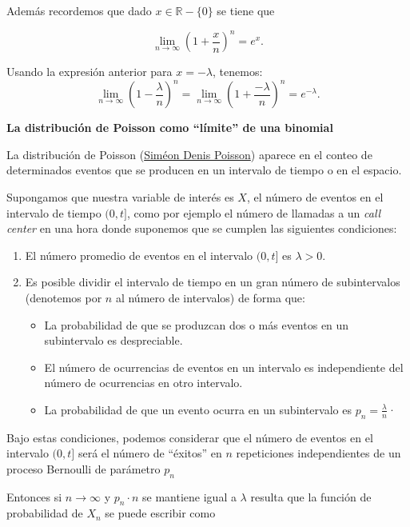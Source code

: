 \documentclass[]{book}
\providecommand{\tightlist}{%
  \setlength{\itemsep}{0pt}\setlength{\parskip}{0pt}}
\begin{document}
Además recordemos que dado \(x\in\mathbb{R}-\{0\}\) se tiene que

\[
\lim_{n\to\infty} \left(1+\frac{x}{n}\right)^n=e^x.
\]

Usando la expresión anterior para \(x=-\lambda\), tenemos:
\[
\lim_{n\to\infty} \left(1-\frac{\lambda}{n}\right)^n=\lim_{n\to\infty} \left(1+\frac{-\lambda}{n}\right)^n=e^{-\lambda}.
\]

\textbf{La distribución de Poisson como ``límite'' de una binomial}

La distribución de Poisson (\href{https://es.wikipedia.org/wiki/Sim\%C3\%A9on_Denis_Poisson}{Siméon Denis Poisson}) aparece en el conteo de determinados eventos que se producen en un intervalo de tiempo o en el espacio.

Supongamos que nuestra variable de interés es \(X\), el número de eventos en el intervalo de tiempo \((0,t]\), como por ejemplo el número de llamadas a un \emph{call center} en una hora donde suponemos que se cumplen las siguientes condiciones:

\begin{enumerate}
\def\labelenumi{\arabic{enumi}.}
\tightlist
\item
  El número promedio de eventos en el intervalo \((0,t]\) es \(\lambda>0\).
\item
  Es posible dividir el intervalo de tiempo en un
  gran número de subintervalos (denotemos por \(n\) al número de intervalos) de forma que:

  \begin{itemize}
  \tightlist
  \item
    La probabilidad de que se produzcan dos o más eventos en un subintervalo es despreciable.
  \item
    El número de ocurrencias de eventos en un intervalo es independiente del número de ocurrencias en otro intervalo.
  \item
    La probabilidad de que un evento ocurra en un subintervalo es \(p_n=\frac{\lambda}{n}\)·
  \end{itemize}
\end{enumerate}

Bajo estas condiciones, podemos considerar que el número de eventos en el intervalo \((0,t]\) será el número de ``éxitos'' en \(n\) repeticiones independientes de un proceso Bernoulli de parámetro \(p_n\)

Entonces si \(n\to\infty\) y \(p_n\cdot n\) se mantiene igual a \(\lambda\) resulta que la función de probabilidad de \(X_n\) se puede escribir como
\end{document}

